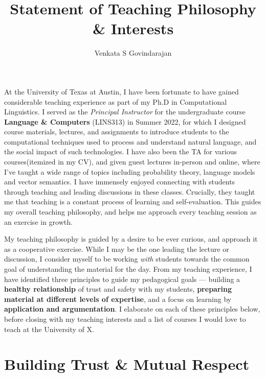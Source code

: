 \documentclass[11pt, letterpaper]{practical-report}
\title[]{Statement of Teaching Philosophy \& Interests}
\author{Venkata S Govindarajan}
\date{}
\begin{document}
\maketitle

At the University of Texas at Austin, I have been fortunate to have gained considerable teaching experience as part of my Ph.D in Computational Linguistics.  I served as the \emph{Principal Instructor} for the undergraduate course \textbf{Language \& Computers} ({\rmcs LINS313}) in Summer 2022, for which I designed course materials, lectures, and assignments to introduce students to the computational techniques used to process and understand natural language, and the social impact of such technologies. I have also been the TA for various courses(itemized in my CV), and given guest lectures in-person and online, where I’ve taught a wide range of topics including probability theory, language models and vector semantics. I have immensely enjoyed connecting with students through teaching and leading discussions in these classes. Crucially, they taught me that teaching is a constant process of learning and self-evaluation. This guides my overall teaching philosophy, and helps me approach every teaching session as an exercise in growth.

My teaching philosophy is guided by a desire to be ever curious, and approach it as a cooperative exercise. While I may be the one leading the lecture or discussion, I consider myself to be working \emph{with} students towards the common goal of understanding the material for the day. From my teaching experience, I have identified three principles to guide my pedagogical goals --- building a \textbf{healthy relationship} of trust and safety with my students, \textbf{preparing material at different levels of expertise}, and a focus on learning by \textbf{application and argumentation}. I elaborate on each of these principles below, before closing with my teaching interests and a list of courses I would love to teach at the University of X.

\section*{Building Trust \& Mutual Respect}
\end{document}
